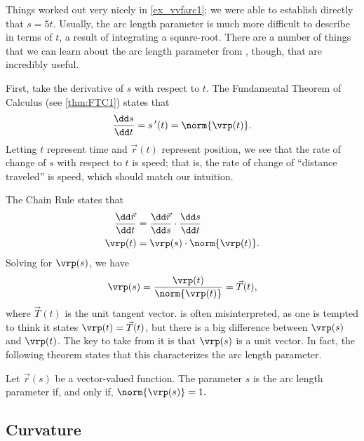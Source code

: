 Things worked out very nicely in \autoref{ex_vvfarc1}; we were able to establish directly that $s=5t$. Usually, the arc length parameter is much more difficult to describe in terms of $t$, a result of integrating a square-root. There are a number of things that we can learn about the arc length parameter from , though, that are incredibly useful.

First, %
take the derivative of $s$ with respect to $t$. The Fundamental Theorem of Calculus (see \autoref{thm:FTC1}) states that
\begin{equation}
\frac{\dd s}{\dd t}=s\,'(t) = \norm{\vrp(t)}.\label{eq:vvfarc3}
\end{equation}
Letting $t$ represent time and $\vec r(t)$ represent position, we see that the rate of change of $s$ with respect to $t$ is speed; that is, the rate of change of ``distance traveled'' is speed, which should match our intuition.

The Chain Rule states that 
\begin{align*}
\frac{\dd\vec r}{\dd t} &= \frac{\dd\vec r}{\dd s}\cdot\frac{\dd s}{\dd t}\\
\vrp(t) &= \vrp(s)\cdot \norm{\vrp(t)}.
\end{align*}
Solving for $\vrp(s)$, we have\vspace{-.3\baselineskip}
\begin{equation}
\vrp(s) = \frac{\vrp(t)}{\norm{\vrp(t)}} = \vec T(t),\label{eq:vvfarc2}
\end{equation}
where $\vec T(t)$ is the unit tangent vector.  is often misinterpreted, as one is tempted to think it states $\vrp(t) = \vec T(t)$, but there is a big difference between $\vrp(s)$ and $\vrp(t)$. The key to take from it is that $\vrp(s)$ is a unit vector. In fact, the following theorem states that this characterizes the arc length parameter.

\begin{theorem}\label{thm:arclengthparam}
Let $\vec r(s)$ be a vector-valued function. The parameter $s$ is the arc length parameter if, and only if, $\norm{\vrp(s)} = 1.$
\end{theorem}

\subsection{Curvature}

